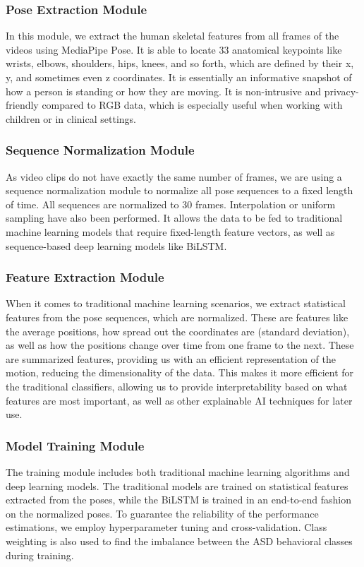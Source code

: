 \subsubsection{Pose Extraction Module}
In this module, we extract the human skeletal features from all frames of the videos using MediaPipe Pose. It is able to locate 33 anatomical keypoints like wrists, elbows, shoulders, hips, knees, and so forth, which are defined by their x, y, and sometimes even z coordinates. It is essentially an informative snapshot of how a person is standing or how they are moving. It is non-intrusive and privacy-friendly compared to RGB data, which is especially useful when working with children or in clinical settings.

\subsubsection{Sequence Normalization Module}
As video clips do not have exactly the same number of frames, we are using a sequence normalization module to normalize all pose sequences to a fixed length of time. All sequences are normalized to 30 frames. Interpolation or uniform sampling have also been performed. It allows the data to be fed to traditional machine learning models that require fixed-length feature vectors, as well as sequence-based deep learning models like BiLSTM.

\subsubsection{Feature Extraction Module}
When it comes to traditional machine learning scenarios, we extract statistical features from the pose sequences, which are normalized. These are features like the average positions, how spread out the coordinates are (standard deviation), as well as how the positions change over time from one frame to the next. These are summarized features, providing us with an efficient representation of the motion, reducing the dimensionality of the data. This makes it more efficient for the traditional classifiers, allowing us to provide interpretability based on what features are most important, as well as other explainable AI techniques for later use.

\subsubsection{Model Training Module}
The training module includes both traditional machine learning algorithms and deep learning models. The traditional models are trained on statistical features extracted from the poses, while the BiLSTM is trained in an end-to-end fashion on the normalized poses. To guarantee the reliability of the performance estimations, we employ hyperparameter tuning and cross-validation. Class weighting is also used to find the imbalance between the ASD behavioral classes during training.
